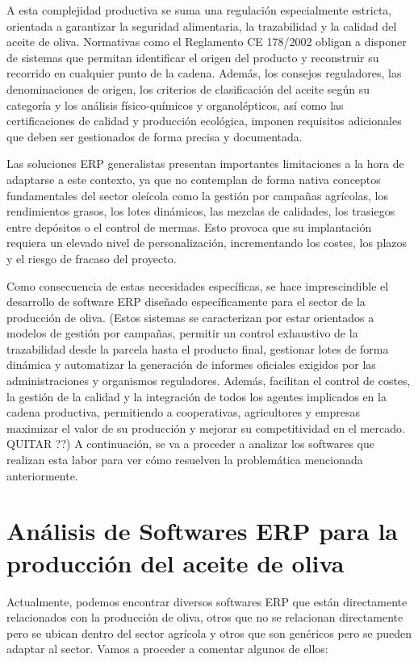 A esta complejidad productiva se suma una regulación especialmente estricta, orientada a garantizar la seguridad 
alimentaria, la trazabilidad y la calidad del aceite de oliva. Normativas como el Reglamento CE 178/2002 obligan a 
disponer de sistemas que permitan identificar el origen del producto y reconstruir su recorrido en cualquier punto de 
la cadena. Además, los consejos reguladores, las denominaciones de origen, los criterios de clasificación del aceite 
según su categoría y los análisis físico-químicos y organolépticos, así como las certificaciones de calidad y producción 
ecológica, imponen requisitos adicionales que deben ser gestionados de forma precisa y documentada.

Las soluciones ERP generalistas presentan importantes limitaciones a la hora de adaptarse a este contexto, ya que no 
contemplan de forma nativa conceptos fundamentales del sector oleícola como la gestión por campañas agrícolas, los 
rendimientos grasos, los lotes dinámicos, las mezclas de calidades, los trasiegos entre depósitos o el control de mermas.
Esto provoca que su implantación requiera un elevado nivel de personalización, incrementando los costes, los plazos y el 
riesgo de fracaso del proyecto.

Como consecuencia de estas necesidades específicas, se hace imprescindible el desarrollo de software ERP diseñado 
específicamente para el sector de la producción de oliva. (Estos sistemas se caracterizan por estar orientados a modelos 
de gestión por campañas, permitir un control exhaustivo de la trazabilidad desde la parcela hasta el producto final, 
gestionar lotes de forma dinámica y automatizar la generación de informes oficiales exigidos por las administraciones y 
organismos reguladores. Además, facilitan el control de costes, la gestión de la calidad y la integración de todos los 
agentes implicados en la cadena productiva, permitiendo a cooperativas, agricultores y empresas maximizar el valor de su 
producción y mejorar su competitividad en el mercado. QUITAR ??) A continuación, se va a proceder a analizar los softwares
que realizan esta labor para ver cómo resuelven la problemática mencionada anteriormente.

\section{Análisis de Softwares ERP para la producción del aceite de oliva}

Actualmente, podemos encontrar diversos softwares ERP que están directamente relacionados con la producción de oliva,
otros que no se relacionan directamente pero se ubican dentro del sector agrícola y otros que son genéricos pero se 
pueden adaptar al sector. Vamos a proceder a comentar algunos de ellos:

